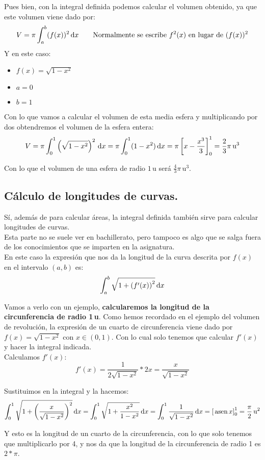 \documentclass[a4paper,11pt,answers]{exam}
\begin{document}
Pues bien, con la integral definida podemos calcular el volumen obtenido, ya que este volumen viene dado por:
\[V = \pi\integrald{(f(x))^2}{x}{a}{b}\quad\quad
\text{Normalmente se escribe }f^2(x)\text{ en lugar de }(f(x))^2\]
Y en este caso:
\begin{itemize}
	\item $f(x) = \sqrt{1 - x^2}$
	\item $a = 0$
	\item $b = 1$
\end{itemize}
Con lo que vamos a calcular el volumen de esta media esfera y multiplicando por dos obtendremos el volumen de la esfera entera:
\[V = \pi\integrald{\left(\sqrt{1 - x^2}\right)^2}{x}{0}{1} =
\pi\integrald{(1 -x^2)}{x}{0}{1} =\pi\left[x -\frac{x^3}{3}\right]_0^1 = 
\frac{2}{3}\pi\,\text{u}^3\]

Con lo que el volumen de una esfera de radio $1\,\text{u}$ será $\frac{4}{3}\pi\,\text{u}^3$.

\subsection{Cálculo de longitudes de curvas.}
Sí, además de para calcular áreas, la integral definida también sirve para calcular longitudes de curvas.\\
Esta parte no se suele ver en bachillerato, pero tampoco es algo que se salga fuera de los conocimientos que se imparten en la asignatura.\\

En este caso la expresión que nos da la longitud de la curva descrita por $f(x)$ en el intervalo $(a, b)$ es:
\[\integrald{\sqrt{1 + \left(f'(x)\right)^2}}{x}{a}{b}\]

Vamos a verlo con un ejemplo, \textbf{calcularemos la longitud de la circunferencia de radio 1\,u}.
Como hemos recordado en el ejemplo del volumen de revolución, la expresión de un cuarto de circunferencia viene dado por $f(x) = \sqrt{1 -x^2}$ con $x \in (0, 1)$. Con lo cual solo tenemos que calcular $f'(x)$ y hacer la integral indicada.\\

Calculamos $f'(x)$:
\[f'(x) = \frac{1}{2\sqrt{1 -x^2}} *2x = \frac{x}{\sqrt{1 - x^2}}\]

Sustituimos en la integral y la hacemos:
\[\integrald{\sqrt{1+\left(\frac{x}{\sqrt{1-x^2}}\right)^2}}{x}{0}{1} =
\integrald{\sqrt{1 + \frac{x^2}{1 - x^2}}}{x}{0}{1} =
\integrald{\frac{1}{\sqrt{1-x^2}}}{x}{0}{1} =
\left[\asen x \right]_0^1 = \frac{\pi}{2}\,\text{u}^2\]

Y esto es la longitud de un cuarto de la circunferencia, con lo que solo tenemos que multiplicarlo por 4, y nos da que la longitud de la circunferencia de radio 1 es $2*\pi$.
\end{document}
